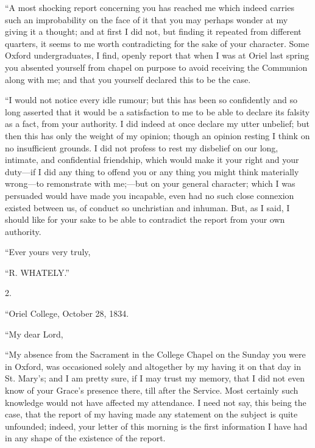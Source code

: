 ``A most shocking report concerning you has reached me which indeed
carries such an improbability on the face of it that you may perhaps
wonder at my giving it a thought; and at first I did not, but finding it
repeated from different quarters, it seems to me worth contradicting for
the sake of your character. Some Oxford undergraduates, I find, openly
report that when I was at Oriel last spring you absented yourself from
chapel on purpose to avoid receiving the Communion along with me; and
that you yourself declared this to be the case.

``I would not notice every idle rumour; but this has
been so confidently and so long asserted that it would be a satisfaction
to me to be able to declare its falsity as a fact, from your authority.
I did indeed at once declare my utter unbelief; but then this has only
the weight of my opinion; though an opinion resting I think on no
insufficient grounds. I did not profess to rest my disbelief on our
long, intimate, and confidential friendship, which would make it your
right and your duty—if I did any thing to offend you or any thing you
might think materially wrong—to remonstrate with me;—but on your
general character; which I was persuaded would have made you incapable,
even had no such close connexion existed between us, of conduct so
unchristian and inhuman. But, as I said, I should like for your sake to
be able to contradict the report from your own authority.

``Ever yours very truly,

``R. WHATELY.''

2.

``Oriel College, October 28, 1834.

``My dear Lord,

``My absence from the Sacrament in the College Chapel on the Sunday you
were in Oxford, was occasioned solely and altogether by my having it on
that day in St. Mary's; and I am pretty sure, if I may trust my memory,
that I did not even know of your Grace's presence there, till after the
Service. Most certainly such knowledge would not have affected my
attendance. I need not say, this being the case, that the report of my
having made any statement on the subject is quite unfounded; indeed,
your letter of this morning is the first information I have had in any
shape of the existence of the report.

